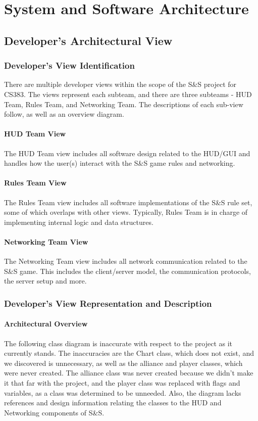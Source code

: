 \documentclass[12pt,a4paper,titlepage]{article}
\begin{document}
\section{System and Software Architecture}
\subsection{Developer's Architectural View}
\subsubsection{Developer's View Identification}
There are multiple developer views within the scope of the S\&S project for CS383. The views represent each subteam, and there are three subteams - HUD Team, Rules Team, and Networking Team. The descriptions of each sub-view follow, as well as an overview diagram.
\paragraph{HUD Team View} The HUD Team view includes all software design related to the HUD/GUI and handles how the user(s) interact with the S\&S game rules and networking. 
\paragraph{Rules Team View} The Rules Team view includes all software implementations of the S\&S rule set, some of which overlaps with other views. Typically, Rules Team is in charge of implementing internal logic and data structures.
\paragraph{Networking Team View} The Networking Team view includes all network communication related to the S\&S game. This includes the client/server model, the communication protocols, the server setup and more.
\subsubsection{Developer's View Representation and Description}
\paragraph{Architectural Overview}
The following class diagram is inaccurate with respect to the project as it currently stands. The inaccuracies are the Chart class, which does not exist, and we discovered is unnecessary, as well as the alliance and player classes, which were never created. The alliance class was never created because we didn't make it that far with the project, and the player class was replaced with flags and variables, as a class was determined to be unneeded. Also, the diagram lacks references and design information relating the classes to the HUD and Networking components of S\&S.

\end{document}
